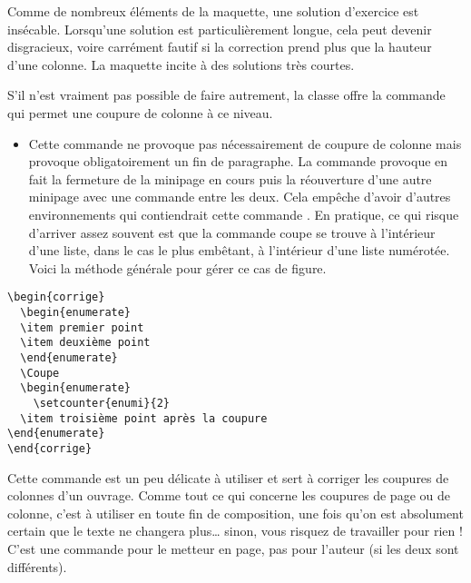 \documentclass[nocrop]{sesamanuel}
\begin{document}
\begin{attention}
Comme de nombreux éléments de la maquette, une solution d'exercice est
insécable. Lorsqu'une solution est particulièrement longue, cela peut
devenir disgracieux, voire carrément fautif si la correction prend
plus que la hauteur d'une colonne. La maquette incite à des solutions
très courtes. 

S'il n'est  vraiment pas possible de faire autrement,
la classe offre la commande  qui permet une coupure de
colonne à ce niveau.
\end{attention}
\vfill \clearpage
\renewcommand{\StringDOCUMENTATION}{La commande \cmd{Coupe}}
\begin{documentation}
\begin{itemize}
 \item  
Cette commande ne provoque pas
nécessairement de coupure de colonne mais provoque obligatoirement un
fin de paragraphe.
La commande  provoque en fait la fermeture de la minipage
en cours puis la réouverture d'une autre minipage avec une commande
 entre les deux. Cela empêche d'avoir d'autres environnements
qui contiendrait cette commande . En pratique, ce qui
risque d'arriver assez souvent est que la commande coupe se trouve à
l'intérieur d'une liste, dans le cas le plus embêtant, à l'intérieur
d'une liste numérotée. Voici la méthode générale pour gérer ce cas de
figure.
\end{itemize}
\end{documentation}
\begin{code}
\begin{verbatim}
\begin{corrige}
  \begin{enumerate}
  \item premier point
  \item deuxième point
  \end{enumerate}
  \Coupe
  \begin{enumerate}
    \setcounter{enumi}{2}
  \item troisième point après la coupure
\end{enumerate}
\end{corrige}
\end{verbatim}
\end{code}
\begin{attention}
Cette commande est un peu délicate à utiliser et sert à corriger les
coupures de colonnes d'un ouvrage. Comme tout ce qui concerne les
coupures de page ou de colonne, c'est à utiliser en toute fin de
composition, une fois qu'on est absolument certain que le texte ne
changera plus\ldots{} sinon, vous risquez de travailler pour rien !
C'est une commande pour le metteur en page, pas pour l'auteur (si les
deux sont différents).
\end{attention}
\end{document}
